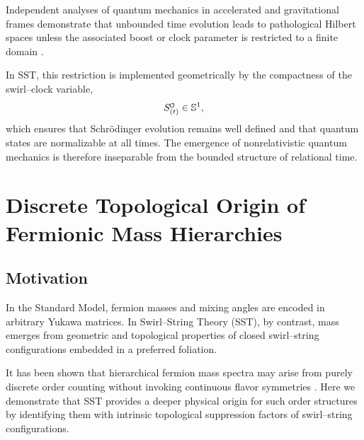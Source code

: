 \documentclass[11pt]{article}
\newcommand{\SwirlClock}{S_{(t)}^{\mkern-2mu\scriptscriptstyle\boldsymbol{\circlearrowleft}}}
\begin{document}
                Independent analyses of quantum mechanics in accelerated and gravitational
                frames demonstrate that unbounded time evolution leads to pathological
                Hilbert spaces unless the associated boost or clock parameter is restricted to
                a finite domain \cite{DiBiagio2021EmergentTime,Makela2024QuantumGravity}.

                In SST, this restriction is implemented geometrically by the compactness of the
                swirl--clock variable,
            \begin{equation}
                \SwirlClock \in \mathbb{S}^1,
                \end{equation}
                which ensures that Schr\"odinger evolution remains well defined and that
                quantum states are normalizable at all times.
                The emergence of nonrelativistic quantum mechanics is therefore inseparable
                from the bounded structure of relational time.

    \section{Discrete Topological Origin of Fermionic Mass Hierarchies}
        \label{app:topological_mass_hierarchy}

        \subsection{Motivation}

            In the Standard Model, fermion masses and mixing angles are encoded in arbitrary Yukawa
            matrices. In Swirl--String Theory (SST), by contrast, mass emerges from geometric and
            topological properties of closed swirl--string configurations embedded in a preferred
            foliation.

            It has been shown that hierarchical fermion mass spectra may arise from purely discrete
            order counting without invoking continuous flavor symmetries
            \cite{FroggattNielsen1979,Abbas2019Z2Z5}.
            Here we demonstrate that SST provides a deeper physical origin for such order structures
            by identifying them with intrinsic topological suppression factors of swirl--string
            configurations.
\end{document}
